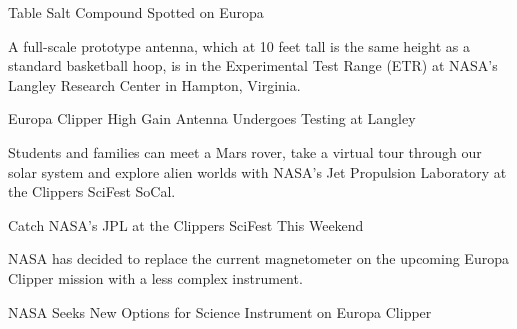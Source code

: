 \documentclass[a4paper,11pt]{article}
\begin{document}
\begin{docenv}
{Table Salt Compound Spotted on Europa

A full-scale prototype antenna, which at 10 feet tall is the same height as a standard basketball hoop, is in the Experimental Test Range (ETR) at NASA's Langley Research Center in Hampton, Virginia.

Europa Clipper High Gain Antenna Undergoes Testing at Langley

Students and families can meet a Mars rover, take a virtual tour through our solar system and explore alien worlds with NASA's Jet Propulsion Laboratory at the Clippers SciFest SoCal.

Catch NASA's JPL at the Clippers SciFest This Weekend

NASA has decided to replace the current magnetometer on the upcoming Europa Clipper mission with a less complex instrument. 

NASA Seeks New Options for Science Instrument on Europa Clipper}
\end{docenv}
\end{document}
